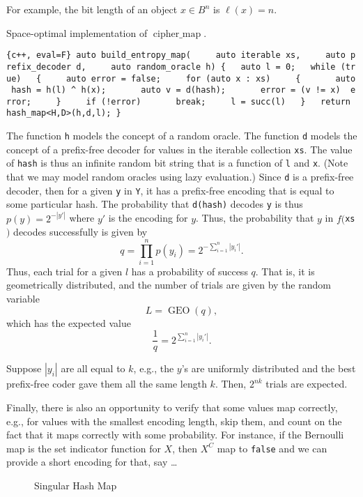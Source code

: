 \documentclass[
]{article}
\theoremstyle{definition}
\theoremstyle{definition}
\theoremstyle{definition}
\theoremstyle{definition}
\theoremstyle{remark}
\begin{document}
For example, the bit length of an object \(x \in B^n\) is \(\ell(x) = n\).

Space-optimal implementation of \(\operatorname{cipher\_map}\).

\texttt{\{c++,\ eval=F\}\ auto\ build\_entropy\_map(\ \ \ \ \ auto\ iterable\ xs,\ \ \ \ \ auto\ prefix\_decoder\ d,\ \ \ \ \ auto\ random\_oracle\ h)\ \{\ \ \ auto\ l\ =\ 0;\ \ \ while\ (true)\ \ \ \{\ \ \ \ \ auto\ error\ =\ false;\ \ \ \ \ for\ (auto\ x\ :\ xs)\ \ \ \ \ \{\ \ \ \ \ \ \ auto\ hash\ =\ h(l)\ \^{}\ h(x);\ \ \ \ \ \ \ auto\ v\ =\ d(hash);\ \ \ \ \ \ \ error\ =\ (v\ !=\ x)\ \textbar{}\textbar{}\ error;\ \ \ \ \ \}\ \ \ \ \ if\ (!error)\ \ \ \ \ \ \ break;\ \ \ \ \ l\ =\ succ(l)\ \ \ \}\ \ \ return\ hash\_map\textless{}H,D\textgreater{}(h,d,l);\ \}}

The function \texttt{h} models the concept of a random oracle.
The function \texttt{d} models the concept of a prefix-free decoder for values in the
iterable collection \texttt{xs}.
The value of \texttt{hash} is thus an infinite random bit string that is a function of
\texttt{l} and \texttt{x}. (Note that we may model random oracles using lazy evaluation.)
Since \texttt{d} is a prefix-free decoder, then for a given \texttt{y} in \texttt{Y}, it has a
prefix-free encoding that is equal to some particular hash.
The probability that \texttt{d(hash)} decodes \texttt{y} is thus \(p(y) = 2^{-|y'|}\)
where \(y'\) is the encoding for \(y\).
Thus, the probability that \(y\) in \(f(\)\texttt{xs}\()\) decodes successfully is given by
\[
q = \prod_{i=1}^n p(y_i) = 2^{-\sum_{i=1}^n |y_i'|}.
\]
Thus, each trial for a given \(l\) has a probability of success \(q\).
That is, it is geometrically distributed, and the number of trials are given
by the random variable
\[
L = \operatorname{GEO}(q),
\]
which has the expected value
\[
\frac{1}{q} = 2^{\sum_{i=1}^n |y_i'|}.
\]

Suppose \(|y_i|\) are all equal to \(k\), e.g., the \(y\)'s are uniformly distributed
and the best prefix-free coder gave them all the same length \(k\).
Then, \(2^{n k}\) trials are expected.

Finally, there is also an opportunity to verify that some values map correctly,
e.g., for values with the smallest encoding length, skip them, and count
on the fact that it maps correctly with some probability.
For instance, if the Bernoulli map is the set indicator function for \(X\),
then \(X^C\) map to \texttt{false} and we can provide a short encoding for that, say
\ldots{}

\begin{figure}
    \centering
    
    \caption{Singular Hash Map}
    \label{fig:shmap}
\end{figure}
\end{document}
